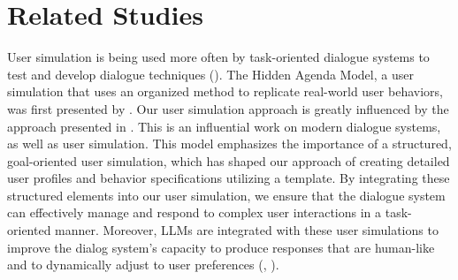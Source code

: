 \section{Related Studies}
User simulation is being used more often by task-oriented dialogue systems to test and develop dialogue techniques (\citet{gur2018user}). The Hidden Agenda Model, a user simulation that uses an organized method to replicate real-world user behaviors, was first presented by \citet{schatzmann2009hidden}. Our user simulation approach is greatly influenced by the approach presented in \citet{schatzmann2009hidden}. This is an influential work on modern dialogue systems, as well as user simulation. This model emphasizes the importance of a structured, goal-oriented user simulation, which has shaped our approach of creating detailed user profiles and behavior specifications utilizing a template. By integrating these structured elements into our user simulation, we ensure that the dialogue system can effectively manage and respond to complex user interactions in a task-oriented manner. Moreover, LLMs are integrated with these user simulations to improve the dialog system's capacity to produce responses that are human-like and to dynamically adjust to user preferences (\citet{abdullin2024synthetic}, \citet{hudevcek2023large}).
